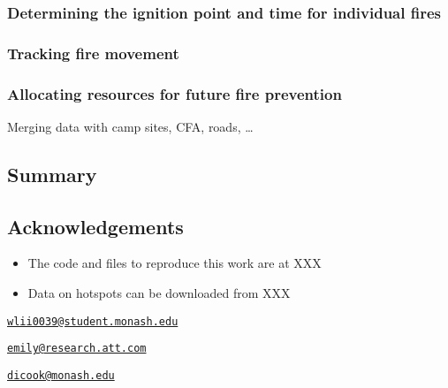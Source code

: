 \hypertarget{determining-the-ignition-point-and-time-for-individual-fires}{%
\subsubsection{Determining the ignition point and time for individual
fires}\label{determining-the-ignition-point-and-time-for-individual-fires}}

\hypertarget{tracking-fire-movement}{%
\subsubsection{Tracking fire movement}\label{tracking-fire-movement}}

\hypertarget{allocating-resources-for-future-fire-prevention}{%
\subsubsection{Allocating resources for future fire
prevention}\label{allocating-resources-for-future-fire-prevention}}

Merging data with camp sites, CFA, roads, \ldots{}

\hypertarget{summary}{%
\subsection{Summary}\label{summary}}

\hypertarget{acknowledgements}{%
\subsection{Acknowledgements}\label{acknowledgements}}

\begin{itemize}
\tightlist
\item
  The code and files to reproduce this work are at XXX
\item
  Data on hotspots can be downloaded from XXX
\end{itemize}




\address{%
Weihao Li\\
Monash University\\
line 1\\ line 2\\
}
\href{mailto:wlii0039@student.monash.edu}{\nolinkurl{wlii0039@student.monash.edu}}

\address{%
Emily Dodwell\\
AT\&T\\
line 1\\ line 2\\
}
\href{mailto:emily@research.att.com}{\nolinkurl{emily@research.att.com}}

\address{%
Dianne Cook\\
Monash University\\
line 1\\ line 2\\
}
\href{mailto:dicook@monash.edu}{\nolinkurl{dicook@monash.edu}}

